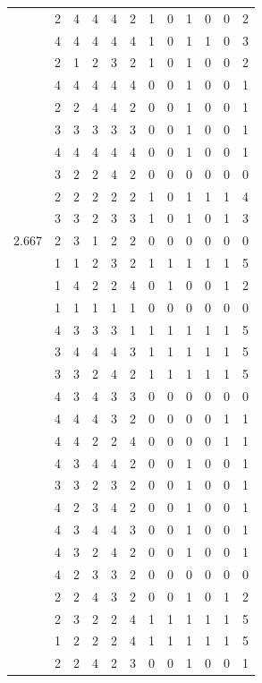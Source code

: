 \documentclass[]{msu-thesis}
\theoremstyle{definition}
\theoremstyle{definition}
\theoremstyle{definition}
\theoremstyle{remark}
\begin{document}
\begin{table}
{\begin{tabular}[t]{rrrrrrrrrrrr}
 & 2 & 4 & 4 & 4 & 2 & 1 & 0 & 1 & 0 & 0 & 2\\
 & 4 & 4 & 4 & 4 & 4 & 1 & 0 & 1 & 1 & 0 & 3\\
 & 2 & 1 & 2 & 3 & 2 & 1 & 0 & 1 & 0 & 0 & 2\\
 & 4 & 4 & 4 & 4 & 4 & 0 & 0 & 1 & 0 & 0 & 1\\
 & 2 & 2 & 4 & 4 & 2 & 0 & 0 & 1 & 0 & 0 & 1\\
 & 3 & 3 & 3 & 3 & 3 & 0 & 0 & 1 & 0 & 0 & 1\\
 & 4 & 4 & 4 & 4 & 4 & 0 & 0 & 1 & 0 & 0 & 1\\
 & 3 & 2 & 2 & 4 & 2 & 0 & 0 & 0 & 0 & 0 & 0\\
 & 2 & 2 & 2 & 2 & 2 & 1 & 0 & 1 & 1 & 1 & 4\\
 & 3 & 3 & 2 & 3 & 3 & 1 & 0 & 1 & 0 & 1 & 3\\
2.667 & 2 & 3 & 1 & 2 & 2 & 0 & 0 & 0 & 0 & 0 & 0\\
 & 1 & 1 & 2 & 3 & 2 & 1 & 1 & 1 & 1 & 1 & 5\\
 & 1 & 4 & 2 & 2 & 4 & 0 & 1 & 0 & 0 & 1 & 2\\
 & 1 & 1 & 1 & 1 & 1 & 0 & 0 & 0 & 0 & 0 & 0\\
 & 4 & 3 & 3 & 3 & 1 & 1 & 1 & 1 & 1 & 1 & 5\\
 & 3 & 4 & 4 & 4 & 3 & 1 & 1 & 1 & 1 & 1 & 5\\
 & 3 & 3 & 2 & 4 & 2 & 1 & 1 & 1 & 1 & 1 & 5\\
 & 4 & 3 & 4 & 3 & 3 & 0 & 0 & 0 & 0 & 0 & 0\\
 & 4 & 4 & 4 & 3 & 2 & 0 & 0 & 0 & 0 & 1 & 1\\
 & 4 & 4 & 2 & 2 & 4 & 0 & 0 & 0 & 0 & 1 & 1\\
 & 4 & 3 & 4 & 4 & 2 & 0 & 0 & 1 & 0 & 0 & 1\\
 & 3 & 3 & 2 & 3 & 2 & 0 & 0 & 1 & 0 & 0 & 1\\
 & 4 & 2 & 3 & 4 & 2 & 0 & 0 & 1 & 0 & 0 & 1\\
 & 4 & 3 & 4 & 4 & 3 & 0 & 0 & 1 & 0 & 0 & 1\\
 & 4 & 3 & 2 & 4 & 2 & 0 & 0 & 1 & 0 & 0 & 1\\
 & 4 & 2 & 3 & 3 & 2 & 0 & 0 & 0 & 0 & 0 & 0\\
 & 2 & 2 & 4 & 3 & 2 & 0 & 0 & 1 & 0 & 1 & 2\\
 & 2 & 3 & 2 & 2 & 4 & 1 & 1 & 1 & 1 & 1 & 5\\
 & 1 & 2 & 2 & 2 & 4 & 1 & 1 & 1 & 1 & 1 & 5\\
 & 2 & 2 & 4 & 2 & 3 & 0 & 0 & 1 & 0 & 0 & 1\\

\end{tabular}}
\end{table}
\end{document}
